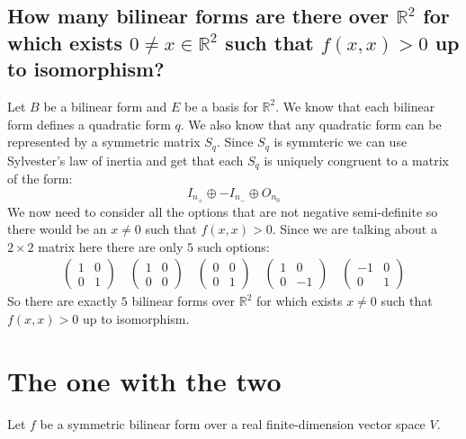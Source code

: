 \documentclass[11pt,a4paper]{article}
\theoremstyle{plain}
\newcommand{\R}{\mathbb{R}}
\begin{document}
	\subsection{How many bilinear forms are there over $\R^2$ for which 
	exists $0\neq x\in\R^2$ such that $f(x,x) > 0$ up to isomorphism?}
	Let $B$ be a bilinear form and $E$ be a basis for $\R^2$. We know
	that each bilinear form defines a quadratic form $q$. We also
	know that any quadratic form can be represented by a symmetric matrix $S_q$. 
	Since $S_q$ is symmteric we can use Sylvester's law of inertia and get that 
	each $S_q$ is uniquely congruent to a matrix of the form:
	\[
		I_{n_+} \oplus -I_{n_-} \oplus O_{n_0}
	\]
	We now need to consider all the options that are not negative semi-definite
	so there would be an $x \neq 0$ such that $f(x,x) > 0$.
	Since we are talking about a $2 \times 2$ matrix here there are only $5$
	such options:
	\begin{align*}
		\begin{pmatrix}
			1 & 0 \\
			0 & 1
		\end{pmatrix}
		\quad
		\begin{pmatrix}
			1 & 0 \\
			0 & 0
		\end{pmatrix}
		\quad
		\begin{pmatrix}
			0 & 0 \\
			0 & 1
		\end{pmatrix}
		\quad
		\begin{pmatrix}
			1 & 0 \\
			0 & -1
		\end{pmatrix}
		\quad
		\begin{pmatrix}
			-1 & 0 \\
			0 & 1
		\end{pmatrix}
	\end{align*}
	So there are exactly $5$ bilinear forms over $\R^2$ for which exists $x\neq0$
	such that $f(x,x) > 0$ up to isomorphism.
	
	
	\newpage
	
	\section{The one with the two}
	Let $f$ be a symmetric bilinear form over a real finite-dimension vector 
	space $V$.
\end{document}
